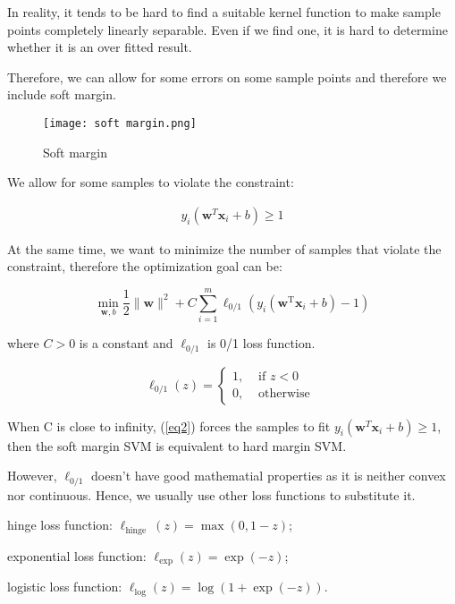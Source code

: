 \documentclass{article}
\begin{document}
In reality, it tends to be hard to find a suitable kernel function to make sample points completely linearly separable. Even if we find one, it is hard to determine whether it is an over fitted result.

Therefore, we can allow for some errors on some sample points and therefore we include soft margin.

\begin{figure}[H]
\centering
\texttt{[image: soft margin.png]}
\caption{Soft margin}
\label{fig3}
\end{figure}

We allow for some samples to violate the constraint:

\begin{gather*}
y_i(\boldsymbol{w}^T\boldsymbol{x}_i + b) \geq 1
\end{gather*}

At the same time, we want to minimize the number of samples that violate the constraint, therefore the optimization goal can be:

\begin{equation} \label{eq2}
\min _{\boldsymbol{w}, b} \frac{1}{2}\|\boldsymbol{w}\|^2+C \sum_{i=1}^m \ell_{0 / 1}\left(y_i\left(\boldsymbol{w}^{\mathrm{T}} \boldsymbol{x}_i+b\right)-1\right)
\end{equation}

where $C > 0$ is a constant and $\ell_{0 / 1}$ is 0/1 loss function.

\begin{equation}
\ell_{0 / 1}(z)= \begin{cases}1, & \text { if } z<0 \\ 0, & \text { otherwise }\end{cases}
\end{equation}

When C is close to infinity, (\ref{eq2}) forces the samples to fit $y_i(\boldsymbol{w}^T\boldsymbol{x}_i + b) \geq 1$, then the soft margin SVM is equivalent to hard margin SVM.

However, $\ell_{0 / 1}$ doesn't have good mathematial properties as it is neither convex nor continuous. Hence, we usually use other loss functions to substitute it.


hinge loss function: $\ell_{\text {hinge }}(z)=\max (0,1-z)$;

exponential loss function: $\ell_{\exp }(z)=\exp (-z)$;

logistic loss function: $\ell_{\log }(z)=\log (1+\exp (-z))$.
\end{document}
